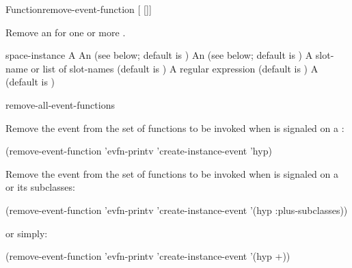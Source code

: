 \documentclass[10pt,twoside,english,pdftex]{article}
\begin{document}

\begin{functiondoc}{Function}{remove-event-function}%
{ [ 
[]] \\
 }
%


\fnsyntax

\fnpurpose Remove an  for one or more .

\fnpackage {}

\fnmodule {}

\fnargs
\begin{args}{space-instance}
\arg[function] A 
 An  
(see below; default is )
 An 
(see below; default is )
 A slot-name or list of slot-names
(default is )
 A  regular expression
(default is \code{(*)})
\arg[permanent] A  (default is \nil)
\end{args}

\fndsyntax
\W\supp\tabletop
\eventclassspec
\subeventingspec
\syntaxsep
\unitclassinstancespec
\subclassingspec

\begin{alsos}{remove-all-event-functions}
\end{alsos}

\fnexamples 
{}%
%
Remove the event   from
the set of functions to be invoked when  is
signaled on a  :
%
\W\supp
\begin{example}
  (remove-event-function 'evfn-printv 'create-instance-event 'hyp)
\end{example}
%
Remove the event   from
the set of functions to be invoked when  is
signaled on a   or its subclasses:
%
\W\supp\notpretop
\begin{example}
  (remove-event-function 'evfn-printv 'create-instance-event '(hyp :plus-subclasses))
\end{example}
%
or simply:
%
\W\supp\notpretop
\begin{example}
  (remove-event-function 'evfn-printv 'create-instance-event '(hyp +))
\end{example}


\end{functiondoc}
\end{document}
